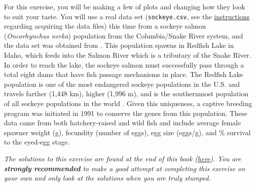 \documentclass[]{book}
\theoremstyle{definition}
\theoremstyle{definition}
\theoremstyle{definition}
\theoremstyle{remark}
\begin{document}
For this exercise, you will be making a few of plots and changing how
they look to suit your taste. You will use a real data set
(\texttt{sockeye.csv}, see the
\protect\hyperlink{data-sets}{instructions} regarding acquiring the data
files) this time from a sockeye salmon (\emph{Oncorhynchus nerka})
population from the Columbia/Snake River system, and the data set was
obtained from \citet{sockeye-cite}. This population spawns in Redfish
Lake in Idaho, which feeds into the Salmon River which is a tributary of
the Snake River. In order to reach the lake, the sockeye salmon must
successfully pass through a total eight dams that have fish passage
mechanisms in place. The Redfish Lake population is one of the most
endangered sockeye populations in the U.S. and travels farther (1,448
km), higher (1,996 m), and is the southernmost population of all sockeye
populations in the world \citep{sockeye-cite}. Given this uniqueness, a
captive breeding program was initiated in 1991 to conserve the genes
from this population. These data came from both hatchery-raised and wild
fish and include average female spawner weight (g), fecundity (number of
eggs), egg size (eggs/g), and \% survival to the eyed-egg stage.

\emph{The solutions to this exercise are found at the end of this book
(\protect\hyperlink{ex2-answers}{here}). You are \textbf{strongly
recommended} to make a good attempt at completing this exercise on your
own and only look at the solutions when you are truly stumped.}
\end{document}
